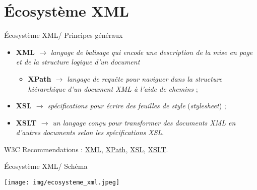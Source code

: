 \documentclass{beamer}
\begin{document}
  \section{Écosystème XML}
  \begin{frame}{Écosystème XML/ Principes généraux}
  \Large
  \begin{itemize}
      \item \textbf{XML $\rightarrow$} \textit{langage de balisage qui encode une description de la mise en page et de la structure logique d'un document}
      \begin{itemize}
          \item \textbf{XPath $\rightarrow$} \textit{langage de requête pour naviguer dans la structure hiérarchique d'un document XML à l'aide de chemins} ;
      \end{itemize}
      \bigskip
      \item \textbf{XSL $\rightarrow$} \textit{spécifications pour écrire des feuilles de style} (\textit{stylesheet}) ;
      \bigskip
      \item \textbf{XSLT $\rightarrow$} \textit{un langage conçu pour transformer des documents XML en d'autres documents selon les spécifications XSL}.
  \end{itemize}
   
   \footnotesize W3C Recommendations : \href{https://www.w3.org/TR/xml11/}{XML}, \href{https://www.w3.org/TR/xpath-31/}{XPath}, \href{https://www.w3.org/TR/xsl/}{XSL}, \href{https://www.w3.org/TR/xslt-30/}{XSLT}.
   
  \end{frame}
  
  \begin{frame}{Écosystème XML/ Schéma}
      \begin{center}
          \texttt{[image: img/ecosysteme\_xml.jpeg]}
      \end{center}
  \end{frame}
  
\end{document}
